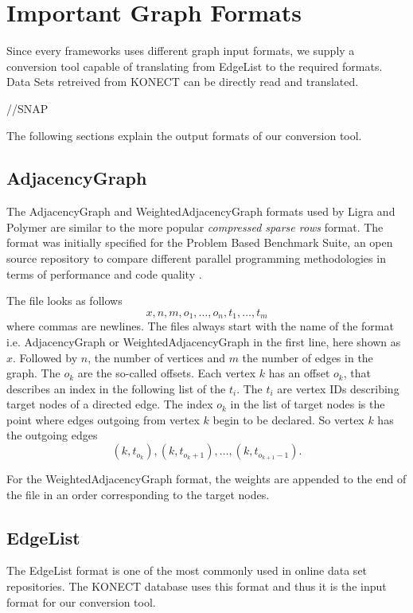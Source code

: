 
\section{Important Graph Formats}
Since every frameworks uses different graph input formats, we supply a conversion tool capable of translating from EdgeList to the required formats.
Data Sets retreived from KONECT can be directly read and translated.

//SNAP

The following sections explain the output formats of our conversion tool.
\subsection{AdjacencyGraph}
The AdjacencyGraph and WeightedAdjacencyGraph formats used by Ligra and Polymer are similar to the more popular \emph{compressed sparse rows} format.
The format was initially specified for the Problem Based Benchmark Suite, an open source repository to compare different parallel programming methodologies in terms of performance and code quality \cite{pbbs}.

The file looks as follows
\begin{equation*}
	x, n, m, o_1, \ldots, o_n, t_1, \ldots, t_m
\end{equation*}
where commas are newlines. The files always start with the name of the format i.e. AdjacencyGraph or WeightedAdjacencyGraph in the first line, here shown as $x$.
Followed by $n$, the number of vertices and $m$ the number of edges in the graph.
The $o_k$ are the so-called offsets. Each vertex $k$ has an offset $o_k$, that describes an index in the following list of the $t_i$.
The $t_i$ are vertex IDs describing target nodes of a directed edge. 
The index $o_k$ in the list of target nodes is the point where edges outgoing from vertex $k$ begin to be declared. So vertex $k$ has the outgoing edges
\begin{equation*}
	(k, t_{o_k}), (k, t_{o_k+1}),\ldots, (k, t_{o_{k+1}-1}).
\end{equation*}

For the WeightedAdjacencyGraph format, the weights are appended to the end of the file in an order corresponding to the target nodes.


\subsection{EdgeList}
The EdgeList format is one of the most commonly used in online data set repositories. The KONECT database uses this format and thus it is the input format for our conversion tool.

